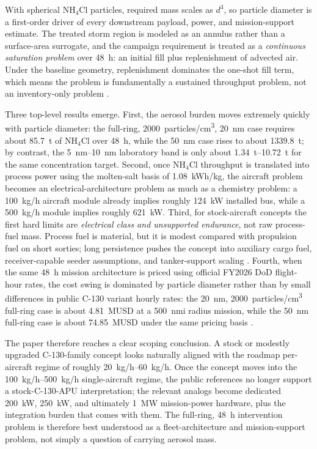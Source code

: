 \documentclass[8pt,twocolumn]{extarticle}
\begin{document}
\vspace{0.25em}
With spherical NH$_4$Cl particles, required mass scales as $d^3$, so particle diameter is a first-order driver of every downstream payload, power, and mission-support estimate. The treated storm region is modeled as an annulus rather than a surface-area surrogate, and the campaign requirement is treated as a \emph{continuous saturation problem} over \SI{48}{h}: an initial fill plus replenishment of advected air. Under the baseline geometry, replenishment dominates the one-shot fill term, which means the problem is fundamentally a sustained throughput problem, not an inventory-only problem \citep{AeolusPayloadMethods}.

\vspace{0.25em}
Three top-level results emerge. First, the aerosol burden moves extremely quickly with particle diameter: the full-ring, \SI{2000}{particles/cm^3}, \SI{20}{nm} case requires about \SI{85.7}{t} of NH$_4$Cl over \SI{48}{h}, while the \SI{50}{nm} case rises to about \SI{1339.8}{t}; by contrast, the \SIrange{5}{10}{nm} laboratory band is only about \SIrange{1.34}{10.72}{t} for the same concentration target. Second, once NH$_4$Cl throughput is translated into process power using the molten-salt basis of \SI{1.08}{kWh/kg}, the aircraft problem becomes an electrical-architecture problem as much as a chemistry problem: a \SI{100}{kg/h} aircraft module already implies roughly \SI{124}{kW} installed bus, while a \SI{500}{kg/h} module implies roughly \SI{621}{kW}. Third, for stock-aircraft concepts the first hard limits are \emph{electrical class and unsupported endurance}, not raw process-fuel mass. Process fuel is material, but it is modest compared with propulsion fuel on short sorties; long persistence pushes the concept into auxiliary cargo fuel, receiver-capable seeder assumptions, and tanker-support scaling \citep{AeolusPowerNote,AeolusFuelNote,AeolusAircraftPower}. Fourth, when the same \SI{48}{h} mission architecture is priced using official FY2026 DoD flight-hour rates, the cost swing is dominated by particle diameter rather than by small differences in public C-130 variant hourly rates: the \SI{20}{nm}, \SI{2000}{particles/cm^3} full-ring case is about \SI{4.81}{MUSD} at a \SI{500}{nmi} radius mission, while the \SI{50}{nm} full-ring case is about \SI{74.85}{MUSD} under the same pricing basis \citep{AeolusCostNote,DoDFY2026Rates}.

\vspace{0.25em}
The paper therefore reaches a clear scoping conclusion. A stock or modestly upgraded C-130-family concept looks naturally aligned with the roadmap per-aircraft regime of roughly \SIrange{20}{60}{kg/h}. Once the concept moves into the \SIrange{100}{500}{kg/h} single-aircraft regime, the public references no longer support a stock-C-130-APU interpretation; the relevant analogs become dedicated \SI{200}{kW}, \SI{250}{kW}, and ultimately \SI{1}{MW} mission-power hardware, plus the integration burden that comes with them. The full-ring, \SI{48}{h} intervention problem is therefore best understood as a fleet-architecture and mission-support problem, not simply a question of carrying aerosol mass.
\end{document}

